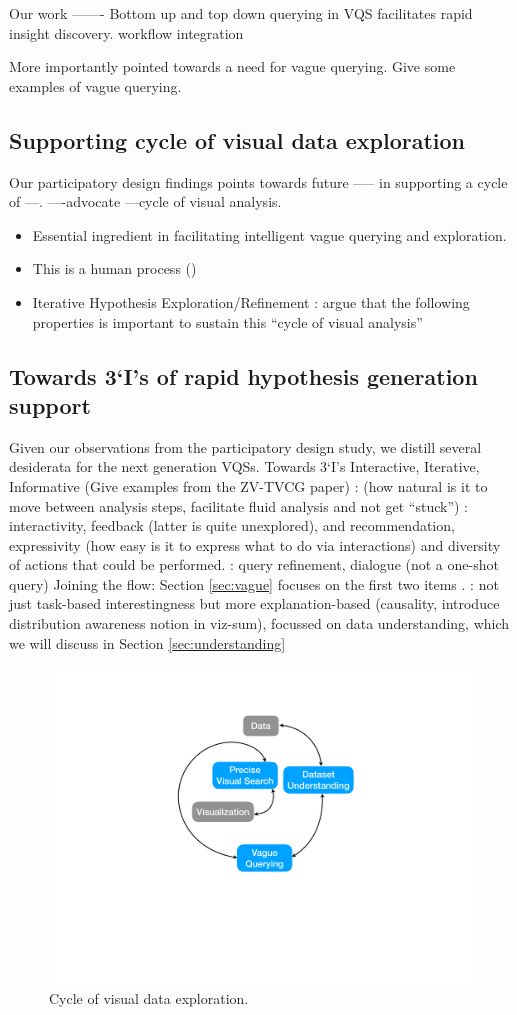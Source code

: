\par Our \zv work ------- Bottom up and top down querying in VQS facilitates rapid insight discovery. 
workflow integration 

More importantly pointed towards a need for vague querying. Give some examples of vague querying.

\subsection{Supporting cycle of visual data exploration}
Our participatory design findings points towards future ----- in supporting a cycle of ---.  ----advocate ---cycle of visual analysis. 
\begin{itemize}
	\item Essential ingredient in facilitating intelligent vague querying and exploration.
	\item This is a human process (\cite{Heer2012,Pirolli})
	\item Iterative Hypothesis Exploration/Refinement : argue that the following properties is important to sustain this “cycle of visual analysis” 
\end{itemize}

\subsection{Towards 3‘I’s of rapid hypothesis generation support}
Given our observations from the participatory design study, we distill several desiderata for the next generation VQSs. 
Towards 3‘I’s Interactive, Iterative, Informative (Give examples from the ZV-TVCG paper)
:
 (how natural is it to move between analysis steps, facilitate fluid analysis and not get ``stuck'') : interactivity, feedback (latter is quite unexplored), and recommendation, expressivity (how easy is it to express what to do via interactions) and diversity of actions that could be performed.
: query refinement, dialogue (not a one-shot query)
Joining the flow: Section \ref{sec:vague} focuses on the first two items .
: not just task-based interestingness but more explanation-based (causality, introduce distribution awareness notion in viz-sum), focussed on data understanding, which we will discuss in Section \ref{sec:understanding}

\begin{figure}[h!]
	\label{fig:cycle}
	\centering
	\includegraphics[width=0.5\linewidth]{figures/cycle.pdf}
	\caption{Cycle of visual data exploration.}
\end{figure}